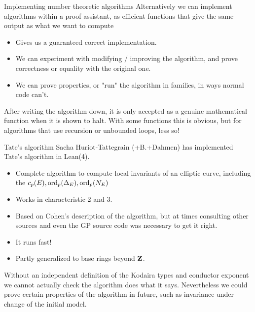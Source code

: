 \begin{frame}{Implementing number theoretic algorithms}
    Alternatively we can implement algorithms within a proof assistant, as efficient functions that give the same output as what we want to compute
    \begin{itemize}
        \item Gives us a guaranteed correct implementation.
        \item We can experiment with modifying / improving the algorithm, and prove correctness or equality with the original one.
        \item We can prove properties, or "run" the algorithm in families, in ways normal code can't.
    \end{itemize}

    After writing the algorithm down, it is only accepted as a genuine mathematical function when it is shown to halt.
    With some functions this is obvious, but for algorithms that use recursion or unbounded loops, less so!
\end{frame}

\begin{frame}{Tate's algorithm}
    Sacha Huriot-Tattegrain (+B.+Dahmen) has implemented Tate's algorithm in Lean(4).

    \begin{itemize}
        \item Complete algorithm to compute local invariants of an elliptic curve, including the $c_p(E), \operatorname{ord}_p(\Delta_E), \operatorname{ord}_p(N_E)$

        \item Works in characteristic 2 and 3.

        \item Based on Cohen's description of the algorithm, but at times consulting other sources and even the GP source code was necessary to get it right.

        \item It runs fast!

        \item Partly generalized to base rings beyond $\mathbf{Z}$.
    \end{itemize}

    Without an independent definition of the Kodaira types and conductor exponent we cannot actually check the algorithm does what it says.
    Nevertheless we could prove certain properties of the algorithm in future, such as invariance under change of the initial model.
\end{frame}


